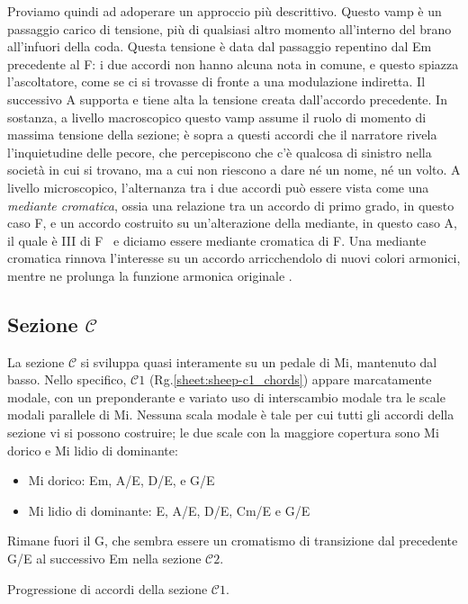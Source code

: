 \documentclass[class=book, crop=false, oneside, 12pt]{standalone}
\begin{document}
    Proviamo quindi ad adoperare un approccio più descrittivo. Questo vamp è un passaggio carico di tensione, più di qualsiasi altro momento all'interno del brano all'infuori della coda. Questa tensione è data dal passaggio repentino dal Em precedente al F\sharp : i due accordi non hanno alcuna nota in comune, e questo spiazza l'ascoltatore, come se ci si trovasse di fronte a una modulazione indiretta. Il successivo A supporta e tiene alta la tensione creata dall'accordo precedente. In sostanza, a livello macroscopico questo vamp assume il ruolo di momento di massima tensione della sezione; è sopra a questi accordi che il narratore rivela l'inquietudine delle pecore, che percepiscono che c'è qualcosa di sinistro nella società in cui si trovano, ma a cui non riescono a dare né un nome, né un volto. A livello microscopico, l'alternanza tra i due accordi può essere vista come una \emph{mediante cromatica}, ossia una relazione tra un accordo di primo grado, in questo caso F\sharp, e un accordo costruito su un'alterazione della mediante,  in questo caso A, il quale è \flat III di F\sharp~ e diciamo essere mediante cromatica di F\sharp. Una mediante cromatica rinnova l'interesse su un accordo arricchendolo di nuovi colori armonici, mentre ne prolunga la funzione armonica originale \cite[p. 202]{benward2014music}.


    \subsection{Sezione \(\mathcal{C}\)}
    La sezione \(\mathcal{C}\) si sviluppa quasi interamente su un pedale di Mi, mantenuto dal basso. Nello specifico, \(\mathcal{C}1\) (Rg.\ref{sheet:sheep-c1_chords}) appare marcatamente modale, con un preponderante e variato uso di interscambio modale tra le scale modali parallele di Mi. Nessuna scala modale è tale per cui tutti gli accordi della sezione vi si possono costruire; le due scale con la maggiore copertura sono Mi dorico e Mi lidio di dominante:
    \begin{itemize}
        \item Mi dorico: Em, A/E, D/E, e G/E
        \item Mi lidio di dominante: E, A/E, D/E, C\sharp m/E e G/E
    \end{itemize}

    Rimane fuori il G\flat, che sembra essere un cromatismo di transizione dal precedente G/E al successivo Em nella sezione \(\mathcal{C}2\).
    
    \begin{sheet}[htbp]
        \centering
        \caption[Progressione di accordi della sezione \(\mathcal{C}1\).]{Progressione di accordi della sezione \(\mathcal{C}1\).}
        \label{sheet:sheep-c1_chords}
    \end{sheet}
\end{document}
